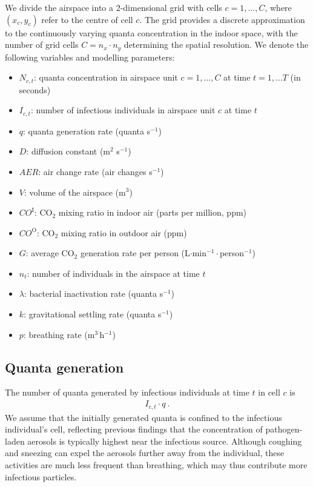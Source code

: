 \documentclass[fleqn,11pt]{wlscirep_supp}
\begin{document}
We divide the airspace into a 2-dimensional grid with cells $c = 1, \dots, C$, where $(x_c, y_c)$ refer to the centre of cell $c$. The grid provides a discrete approximation to the continuously varying quanta concentration in the indoor space, with the number of grid cells $C = n_x \cdot n_y$ determining the spatial resolution. We denote the following variables and modelling parameters:
\begin{itemize}
    \item $N_{c,t}$: quanta concentration in airspace unit $c = 1, \dots, C$ at time $t = 1, \dots T$ (in seconds)
    \item $I_{c,t}$: number of infectious individuals in airspace unit $c$ at time $t$
    \item $q$: quanta generation rate (quanta s$^{-1}$)
    \item $D$: diffusion constant (m$^2$ s$^{-1}$)
    \item $AER$: air change rate (air changes s$^{-1}$)
    \item $V$: volume of the airspace (m$^3$)
    \item $CO^{\text{I}}$: CO$_2$ mixing ratio in indoor air (parts per million, ppm)
    \item $CO^{\text{O}}$: CO$_2$ mixing ratio in outdoor air (ppm)
    \item $G$: average CO$_2$ generation rate per person (L$\cdot$min$^{-1}\cdot$person$^{-1}$)
    \item $n_t$: number of individuals in the airspace at time $t$
    \item $\lambda$: bacterial inactivation rate (quanta s$^{-1}$)
    \item $k$: gravitational settling rate (quanta s$^{-1}$)
    \item $p$: breathing rate (m$^3$\,h$^{-1}$)
\end{itemize}

\subsection{Quanta generation}\label{sec:quanta-generation}

The number of quanta generated by infectious individuals at time $t$ in cell $c$ is 
\begin{align}\label{eq:generation}
    I_{c,t} \cdot q ~.
\end{align}
We assume that the initially generated quanta is confined to the infectious individual's cell, reflecting previous findings that the concentration of pathogen-laden aerosols is typically highest near the infectious source\cite{Wang2021Science,Morawska2021,Vuorinen2020SafSci,Chen2020BuildEnv}. Although coughing and sneezing can expel the aerosols further away from the individual, these activities are much less frequent than breathing, which may thus contribute more infectious particles\cite{Dinkele2022AJRCCM}. 
\end{document}

